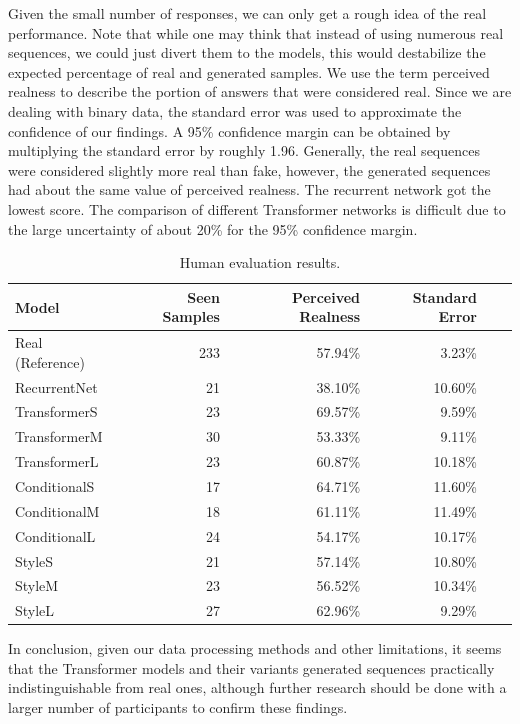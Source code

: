 \documentclass{article}
\begin{document}
Given the small number of responses, we can only get a rough idea of the real performance. Note that while one may think that instead of using numerous real sequences, we could just divert them to the models, this would destabilize the expected percentage of real and generated samples. We use the term perceived realness to describe the portion of answers that were considered real. Since we are dealing with binary data, the standard error was used to approximate the confidence of our findings. A 95\% confidence margin can be obtained by multiplying the standard error by roughly 1.96. Generally, the real sequences were considered slightly more real than fake, however, the generated sequences had about the same value of perceived realness. The recurrent network got the lowest score. The comparison of different Transformer networks is difficult due to the large uncertainty of about 20\% for the 95\% confidence margin. 

\begin{table}[!htbp]
    \centering
    \begin{tabular}{lrrrrr}
        \toprule
        Model & Seen Samples & Perceived Realness & Standard Error \\
        \midrule
        Real (Reference) & 233 & 57.94\% & 3.23\% \\ 
        RecurrentNet & 21 & 38.10\% & 10.60\% \\
        TransformerS & 23 & 69.57\% & 9.59\% \\
        TransformerM & 30 & 53.33\% & 9.11\% \\
        TransformerL & 23 & 60.87\% & 10.18\% \\
        ConditionalS & 17 & 64.71\% & 11.60\% \\
        ConditionalM & 18 & 61.11\% & 11.49\% \\
        ConditionalL & 24 & 54.17\% & 10.17\% \\
        StyleS & 21 & 57.14\% & 10.80\% \\
        StyleM & 23 & 56.52\% & 10.34\% \\
        StyleL & 27 & 62.96\% & 9.29\% \\
        \bottomrule
    \end{tabular}
    \caption{Human evaluation results.}
    \label{tab:human_evaluation}
\end{table}

In conclusion, given our data processing methods and other limitations, it seems that the Transformer models and their variants generated sequences practically indistinguishable from real ones, although further research should be done with a larger number of participants to confirm these findings.
\end{document}
